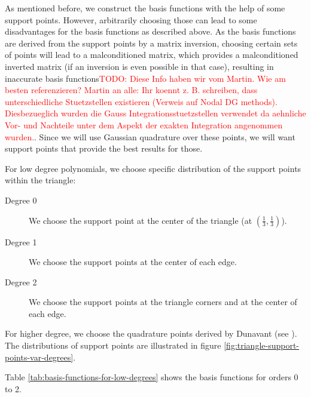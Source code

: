 \documentclass{article}
\newcommand{\todo}[2][]{\textcolor{red}{TODO\ifthenelse{\equal{#1}{}}{}{[#1]}: #2}}
\begin{document}
As mentioned before, we construct the basis functions with the help of some support points. However, arbitrarily choosing those can lead to some disadvantages for the basis functions as described above. As the basis functions are derived from the support points by a matrix inversion, choosing certain sets of points will lead to a malconditioned matrix, which provides a malconditioned inverted matrix (if an inversion is even possible in that case), resulting in inaccurate basis functions\todo{Diese Info haben wir vom Martin. Wie am besten referenzieren? Martin an alle: Ihr koennt z. B. schreiben, dass unterschiedliche Stuetzstellen existieren (Verweis auf Nodal DG methods). Diesbezueglich wurden die Gauss Integrationsstuetzstellen verwendet da aehnliche Vor- und Nachteile unter dem Aspekt der exakten Integration angenommen wurden.}. Since we will use Gaussian quadrature over these points, we will want support points that provide the best results for those.

For low degree polynomials, we choose specific distribution of the support points within the triangle:
\begin{description}
\item[Degree 0] We choose the support point at the center of the triangle (at $\left(\frac{1}{3}, \frac{1}{3}\right)$).
\item[Degree 1] We choose the support points at the center of each edge.
\item[Degree 2] We choose the support points at the triangle corners and at the center of each edge.
\end{description}

For higher degree, we choose the quadrature points derived by Dunavant (see \cite{dunavant1985high}). The distributions of support points are illustrated in figure \ref{fig:triangle-support-points-var-degrees}.

Table \ref{tab:basis-functions-for-low-degrees} shows the basis functions for orders 0 to 2.
\end{document}
